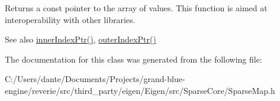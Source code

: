 \begin{DoxyReturn}{Returns}
a const pointer to the array of values. This function is aimed at interoperability with other libraries. 
\end{DoxyReturn}
\begin{DoxySeeAlso}{See also}
\mbox{\hyperlink{class_eigen_1_1_sparse_compressed_base_a197111c1289644f1ea38fe683ccdd82a}{inner\+Index\+Ptr()}}, \mbox{\hyperlink{class_eigen_1_1_sparse_compressed_base_a53a82f962686e18c8dc07a4b9a85ed7b}{outer\+Index\+Ptr()}} 
\end{DoxySeeAlso}


The documentation for this class was generated from the following file\+:\begin{DoxyCompactItemize}
\item 
C\+:/\+Users/dante/\+Documents/\+Projects/grand-\/blue-\/engine/reverie/src/third\+\_\+party/eigen/\+Eigen/src/\+Sparse\+Core/Sparse\+Map.\+h\end{DoxyCompactItemize}
